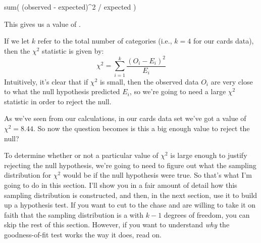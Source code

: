 \begin{rblock1}
sum( (observed - expected)^2 / expected )
\end{rblock1}

This gives us a value of .

\vspace{0.5cm}
\begin{mdframed}[style=MyFrame,nobreak=true]
If we let $k$ refer to the total number of categories (i.e., $k=4$ for our cards data), then the $\chi^2$ statistic is given by:
$$
\chi^2 = \sum_{i=1}^k \frac{(O_i - E_i)^2}{E_i}
$$
Intuitively, it's clear that if $\chi^2$ is small, then the observed data $O_i$ are very close to what the null hypothesis predicted $E_i$, so we're going to need a large $\chi^2$ statistic in order to reject the null. 
\end{mdframed}

As we've seen from our calculations, in our cards data set we've got a value of $\chi^2 = 8.44$. So now the question becomes is this a big enough value to reject the null?


To determine whether or not a particular value of $\chi^2$ is large enough to justify rejecting the null hypothesis, we're going to need to figure out what the sampling distribution for $\chi^2$ would be if the null hypothesis were true. So that's what I'm going to do in this section. I'll show you in a fair amount of detail how this sampling distribution is constructed, and then, in the next section, use it to build up a hypothesis test. If you want to cut to the chase and are willing to take it on faith that the sampling distribution is a  with $k-1$ degrees of freedom, you can skip the rest of this section. However, if you want to understand {\it why} the goodness-of-fit test works the way it does, read on.


